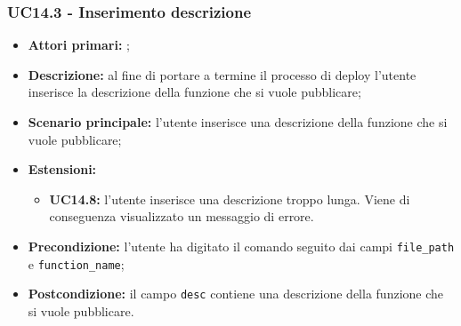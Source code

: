 \subsubsection{UC14.3 - Inserimento descrizione}
\begin{itemize}
	\item \textbf{Attori primari:} \us{};
	\item \textbf{Descrizione:} al fine di portare a termine il processo di deploy l’utente inserisce la descrizione della funzione che si vuole pubblicare;  
	\item \textbf{Scenario principale:} l’utente inserisce una descrizione della funzione che si vuole pubblicare;  
	\item \textbf{Estensioni:} 
	\begin{itemize}
		\item \textbf{UC14.8:} l’utente inserisce una descrizione troppo lunga. Viene di conseguenza visualizzato un messaggio di errore. 
	\end{itemize}
	\item \textbf{Precondizione:}  l’utente ha digitato il comando \deploy{} seguito dai campi \texttt{file\_path} e \texttt{function\_name};
	\item \textbf{Postcondizione:} il campo \texttt{desc} contiene una descrizione della funzione che si vuole pubblicare.
\end{itemize}